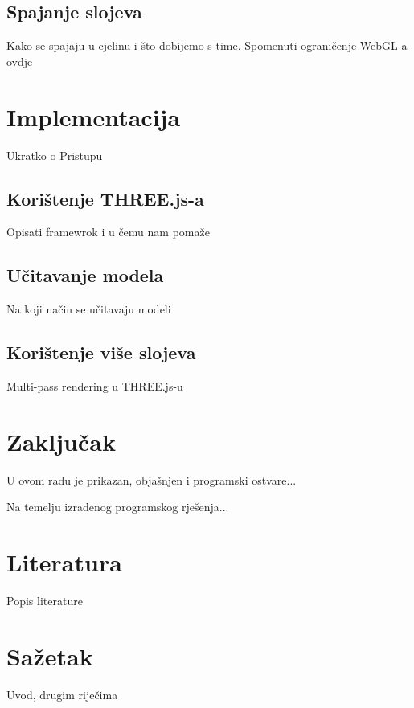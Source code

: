 \documentclass[a4paper]{article}
\begin{document}
\subsection{Spajanje slojeva}

Kako se spajaju u cjelinu i što dobijemo s time. Spomenuti ograničenje WebGL-a ovdje




\section{Implementacija}

Ukratko o Pristupu

\subsection{Korištenje THREE.js-a}

Opisati framewrok i u čemu nam pomaže

\subsection{Učitavanje modela}

Na koji način se učitavaju modeli

\subsection{Korištenje više slojeva}

Multi-pass rendering u THREE.js-u


\section{Zaključak}

U ovom radu je prikazan, objašnjen i programski ostvare...


Na temelju izrađenog programskog rješenja...

\section*{Literatura}

Popis literature

\section*{Sažetak}

Uvod, drugim riječima\\
\end{document}

